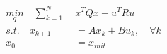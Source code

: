 \documentclass[preview]{standalone}
\begin{document}
\begin{align*}
\underset{q}{min}  \quad \sum_{k=1}^N \; &x^TQx + u^T R u \\ s.t. \quad x_{k+1} &= Ax_k + Bu_k, \quad \forall k \\ x_0 &= x_{init}
\end{align*}
\end{document}
